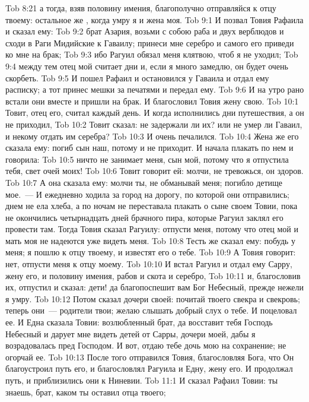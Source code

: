 \vs Tob 8:21 а тогда, взяв половину имения, благополучно отправляйся к отцу твоему: остальное же , когда умру я и жена моя.
\vs Tob 9:1 И позвал Товия Рафаила и сказал ему:
\vs Tob 9:2 брат Азария, возьми с собою раба и двух верблюдов и сходи в Раги Мидийские к Гаваилу; принеси мне серебро и самого его приведи ко мне на брак;
\vs Tob 9:3 ибо Рагуил обязал меня клятвою, чтоб я не уходил;
\vs Tob 9:4 между тем отец мой считает дни и, если я много замедлю, он будет очень скорбеть.
\vs Tob 9:5 И пошел Рафаил и остановился у Гаваила и отдал ему расписку; а тот принес мешки за печатями и передал ему.
\vs Tob 9:6 И на утро рано встали они вместе и пришли на брак. И благословил Товия жену свою.
\vs Tob 10:1 Товит, отец его, считал каждый день. И когда исполнились дни путешествия, а он не приходил,
\vs Tob 10:2 Товит сказал: не задержали ли их? или не умер ли Гаваил, и некому отдать им серебра?
\vs Tob 10:3 И очень печалился.
\vs Tob 10:4 Жена же его сказала ему: погиб сын наш, потому и не приходит. И начала плакать по нем и говорила:
\vs Tob 10:5 ничто не занимает меня, сын мой, потому что я отпустила тебя, свет очей моих!
\vs Tob 10:6 Товит говорит ей: молчи, не тревожься, он здоров.
\vs Tob 10:7 А она сказала ему: молчи ты, не обманывай меня; погибло детище мое.~--- И ежедневно ходила за город на дорогу, по которой они отправились; днем не ела хлеба, а по ночам не переставала плакать о сыне своем Товии, пока не окончились четырнадцать дней брачного пира, которые Рагуил заклял его провести там. Тогда Товия сказал Рагуилу: отпусти меня, потому что отец мой и мать моя не надеются уже видеть меня.
\vs Tob 10:8 Тесть же сказал ему: побудь у меня; я пошлю к отцу твоему, и известят его о тебе.
\vs Tob 10:9 А Товия говорит: нет, отпусти меня к отцу моему.
\vs Tob 10:10 И встал Рагуил и отдал ему Сарру, жену его, и половину имения, рабов и скота и серебро,
\vs Tob 10:11 и, благословив их, отпустил и сказал: дети! да благопоспешит вам Бог Небесный, прежде нежели я умру.
\vs Tob 10:12 Потом сказал дочери своей: почитай твоего свекра и свекровь; теперь они~--- родители твои; желаю слышать добрый слух о тебе. И поцеловал ее. И Една сказала Товии: возлюбленный брат, да восставит тебя Господь Небесный и дарует мне видеть детей от Сарры, дочери моей, дабы я возрадовалась пред Господом. И вот, отдаю тебе дочь мою на сохранение; не огорчай ее.
\rsbpar\vs Tob 10:13 После того отправился Товия, благословляя Бога, что Он благоустроил путь его, и благословлял Рагуила и Едну, жену его. И продолжал путь, и приблизились они к Ниневии.
\vs Tob 11:1 И сказал Рафаил Товии: ты знаешь, брат,  каком  ты оставил отца твоего;

